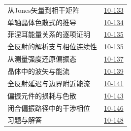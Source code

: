 \begin{longtable}{@{}p{}r@{}}
\hspace{1em}从Jones矢量到相干矩阵&\href{course-page:10:137}{10-133}\\[2pt]
\hspace{1em}单轴晶体色散式的推导&\href{course-page:10:138}{10-134}\\[2pt]
\hspace{1em}菲涅耳能量关系的逐项证明&\href{course-page:10:139}{10-135}\\[2pt]
\hspace{1em}全反射的解析支与相位连续性&\href{course-page:10:139}{10-135}\\[2pt]
\hspace{1em}从测量强度还原偏振态&\href{course-page:10:141}{10-137}\\[2pt]
\hspace{1em}晶体中的波矢与能流&\href{course-page:10:143}{10-139}\\[2pt]
\hspace{1em}全反射延迟与边界附近能流&\href{course-page:10:145}{10-141}\\[2pt]
\hspace{1em}偏振元件的损耗与色散&\href{course-page:10:147}{10-143}\\[2pt]
\hspace{1em}闭合偏振路径中的干涉相位&\href{course-page:10:150}{10-146}\\[2pt]
\hspace{1em}习题与解答&\href{course-page:10:152}{10-148}\\[2pt]
\end{longtable}
